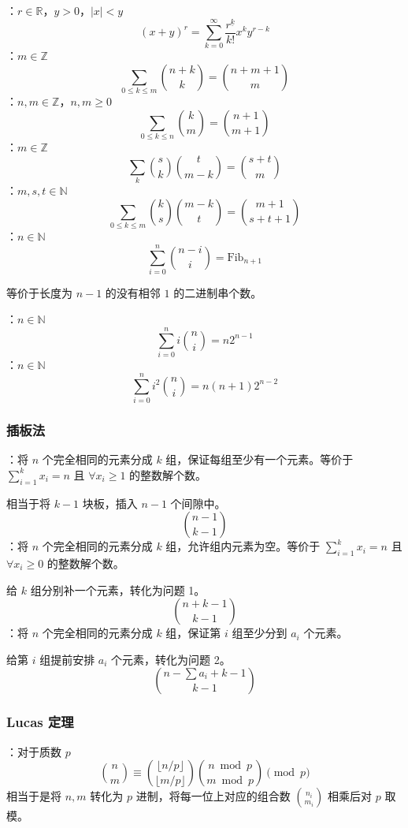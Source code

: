 ：$r \in \mathbb{R}$，$y > 0$，$|x| < y$
\[
(x + y)^r = \sum_{k = 0}^{\infty} \frac{r^{\underline{k}}}{k!} x^{k}y^{r - k}
\]
：$m \in \mathbb{Z}$
\[
\sum_{0 \leq k \leq m} \binom{n + k}{k} = \binom{n + m + 1}{m}
\]
：$n, m \in \mathbb{Z}$，$n, m \geq 0$
\[
\sum_{0 \leq k \leq n}\binom{k}{m} = \binom{n + 1}{m + 1}
\]
：$m \in \mathbb{Z}$
\[
\sum_k \binom{s}{k}\binom{t}{m - k} = \binom{s + t}{m}
\]
：$m, s, t \in \mathbb{N}$
\[
\sum_{0 \leq k \leq m} \binom{k}{s}\binom{m - k}{t} = \binom{m + 1}{s + t + 1}
\]
：$n \in \mathbb{N}$
\[
\sum_{i = 0}^n \binom{n - i}{i} = \mathrm{Fib}_{n + 1}
\]

\begin{quoteblock}
等价于长度为 $n - 1$ 的没有相邻 $1$ 的二进制串个数。
\end{quoteblock}

：$n \in \mathbb{N}$
\[
\sum_{i = 0}^n i\binom{n}{i} = n2^{n - 1}
\]
：$n \in \mathbb{N}$
\[
\sum_{i = 0}^n i^2\binom{n}{i} = n(n + 1)2^{n - 2}
\]

\subsubsection{插板法}

：将 $n$ 个完全相同的元素分成 $k$ 组，保证每组至少有一个元素。等价于 $\sum_{i = 1}^k x_i = n$ 且 $\forall x_i \geq 1$ 的整数解个数。

相当于将 $k - 1$ 块板，插入 $n - 1$ 个间隙中。
\[
\binom{n - 1}{k - 1}
\]
：将 $n$ 个完全相同的元素分成 $k$ 组，允许组内元素为空。等价于 $\sum_{i = 1}^k x_i = n$ 且 $\forall x_i \geq 0$ 的整数解个数。

给 $k$ 组分别补一个元素，转化为问题 1。
\[
\binom{n + k - 1}{k - 1}
\]
：将 $n$ 个完全相同的元素分成 $k$ 组，保证第 $i$ 组至少分到 $a_i$ 个元素。

给第 $i$ 组提前安排 $a_i$ 个元素，转化为问题 2。
\[
\binom{n - \sum a_i + k - 1}{k - 1}
\]

\subsubsection{Lucas 定理}

：对于质数 $p$
\[
\binom{n}{m} \equiv \binom{\lfloor n / p \rfloor}{\lfloor m / p \rfloor}\binom{n \bmod p}{m \bmod p} \pmod p
\]
相当于是将 $n, m$ 转化为 $p$ 进制，将每一位上对应的组合数 $\binom{n_i}{m_i}$ 相乘后对 $p$ 取模。

